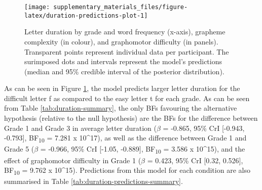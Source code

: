 \documentclass[
  11pt,
  english,
  ,doc,mask,floatsintext]{apa6}
\begin{document}
\begin{figure}[!htb]

{\centering \texttt{[image: supplementary\_materials\_files/figure-latex/duration-predictions-plot-1]} 

}

\caption{Letter duration by grade and word frequency (x-axis), grapheme complexity (in colour), and graphomotor difficulty (in panels). Transparent points represent individual data per participant. The surimposed dots and intervals represent the model's predictions (median and 95\% credible interval of the posterior distribution).}\label{fig:duration-predictions-plot}
\end{figure}

As can be seen in Figure \ref{fig:duration-predictions-plot}, the model predicts larger letter duration for the difficult letter f as compared to the easy letter t for each grade. As can be seen from Table \ref{tab:duration-summary}, the only BFs favouring the alternative hypothesis (relative to the null hypothesis) are the BFs for the difference between Grade 1 and Grade 3 in average letter duration (\(\beta\) = -0.865, 95\% CrI {[}-0.943, -0.793{]}, BF\textsubscript{10} = 7.281 x 10\^{}17), as well as the difference between Grade 1 and Grade 5 (\(\beta\) = -0.966, 95\% CrI {[}-1.05, -0.889{]}, BF\textsubscript{10} = 3.586 x 10\^{}15), and the effect of graphomotor difficulty in Grade 1 (\(\beta\) = 0.423, 95\% CrI {[}0.32, 0.526{]}, BF\textsubscript{10} = 9.762 x 10\^{}15). Predictions from this model for each condition are also summarised in Table \ref{tab:duration-predictions-summary}.
\end{document}
